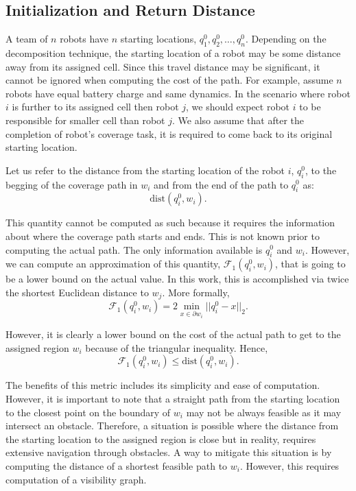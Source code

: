 \documentclass[../main.tex]{subfiles}
\begin{document}
\subsection{Initialization and Return Distance}
\label{subsection:init_ret_distance}

A team of $n$ robots have $n$ starting locations, $q^0_1,q^0_2,\ldots,q^0_n$. Depending on the decomposition technique, the starting location of a robot may be some distance away from its assigned cell. Since this travel distance may be significant, it cannot be ignored when computing the cost of the path. For example, assume $n$ robots have equal battery charge and same dynamics. In the scenario where robot $i$ is further to its assigned cell then robot $j$, we should expect robot $i$ to be responsible for smaller cell than robot $j$. We also assume that after the completion of robot's coverage task, it is required to come back to its original starting location.

Let us refer to the distance from the starting location of the robot $i$, $q^0_i$, to the begging of the coverage path in $w_i$ and from the end of the path to $q^0_i$ as:
\begin{equation}
	\text{dist}(q^0_i,w_i).
\end{equation}

This quantity cannot be computed as such because it requires the information about where the coverage path starts and ends. This is not known prior to computing the actual path. The only information available is $q^0_i$ and $w_i$. However, we can compute an approximation of this quantity, $\mathcal{F}_1(q^0_i,w_i)$, that is going to be a lower bound on the actual value. In this work, this is accomplished via twice the shortest Euclidean distance to $w_j$. More formally, 
\begin{equation}
	\mathcal{F}_1(q^0_i,w_i)=2\min_{x\in\partial w_i}||q^0_i-x||_2.
\end{equation}

However, it is clearly a lower bound on the cost of the actual path to get to the assigned region $w_i$ because of the triangular inequality. Hence,
\begin{equation}
	\mathcal{F}_1(q^0_i,w_i)\leq\text{dist}(q^0_i,w_i).
\end{equation}

The benefits of this metric includes its simplicity and ease of computation. However, it is important to note that a straight path from the starting location to the closest point on the boundary of $w_i$ may not be always feasible as it may intersect an obstacle. Therefore, a situation is possible where the distance from the starting location to the assigned region is close but in reality, requires extensive navigation through obstacles. A way to mitigate this situation is by computing the distance of a shortest feasible path to $w_i$. However, this requires computation of a visibility graph.
\end{document}
